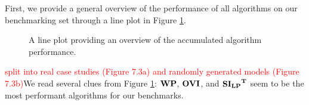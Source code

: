 First, we provide a general overview of the performance of all algorithms on our benchmarking set through a line plot in Figure \ref{fig:AlgoPerformance}.
\begin{figure}[h!]
    \centering
    \qquad
    \qquad
    \caption[Overview of Algorithm Performance]{
        A line plot providing an overview of the accumulated algorithm performance.
        }%
    \label{fig:AlgoPerformanceBig}
    \label{fig:AlgoPerformance}
\end{figure}


\textcolor{red}{split into real case studies (Figure 7.3a) and randomly generated models (Figure 7.3b)}We read several clues from Figure \ref{fig:AlgoPerformance}:
$\mathbf{WP}$, $\mathbf{OVI}$, and $\mathbf{\mathbf{SI_{LP}}^T}$ seem to be the most performant algorithms for our benchmarks.

